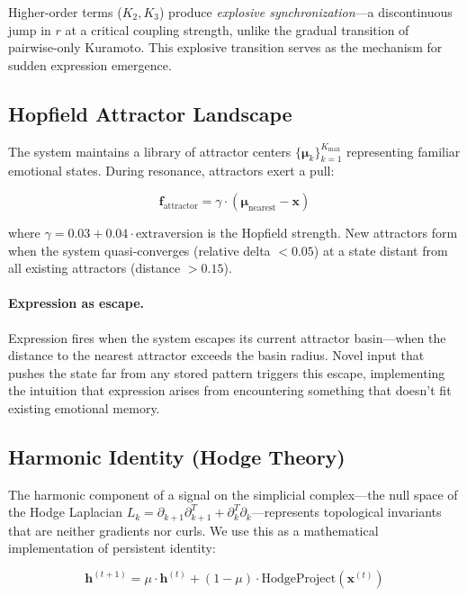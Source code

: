 \documentclass[11pt]{article}
\begin{document}
Higher-order terms ($K_2, K_3$) produce \emph{explosive synchronization}---a discontinuous jump in $r$ at a critical coupling strength, unlike the gradual transition of pairwise-only Kuramoto. This explosive transition serves as the mechanism for sudden expression emergence.

\subsection{Hopfield Attractor Landscape}
\label{sec:hopfield}

The system maintains a library of attractor centers $\{\boldsymbol{\mu}_k\}_{k=1}^{K_{\max}}$ representing familiar emotional states. During resonance, attractors exert a pull:

\begin{equation}
\mathbf{f}_{\text{attractor}} = \gamma \cdot (\boldsymbol{\mu}_{\text{nearest}} - \mathbf{x})
\end{equation}

where $\gamma = 0.03 + 0.04 \cdot \text{extraversion}$ is the Hopfield strength. New attractors form when the system quasi-converges (relative delta $< 0.05$) at a state distant from all existing attractors (distance $> 0.15$).

\paragraph{Expression as escape.} Expression fires when the system escapes its current attractor basin---when the distance to the nearest attractor exceeds the basin radius. Novel input that pushes the state far from any stored pattern triggers this escape, implementing the intuition that expression arises from encountering something that doesn't fit existing emotional memory.

\subsection{Harmonic Identity (Hodge Theory)}
\label{sec:identity}

The harmonic component of a signal on the simplicial complex---the null space of the Hodge Laplacian $L_k = \partial_{k+1}\partial_{k+1}^T + \partial_k^T\partial_k$---represents topological invariants that are neither gradients nor curls. We use this as a mathematical implementation of persistent identity:

\begin{equation}
\mathbf{h}^{(t+1)} = \mu \cdot \mathbf{h}^{(t)} + (1-\mu) \cdot \text{HodgeProject}(\mathbf{x}^{(t)})
\label{eq:identity}
\end{equation}
\end{document}
